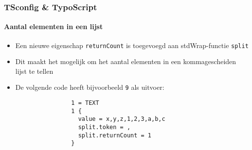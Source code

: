 \begin{frame}[fragile]
	\frametitle{TSconfig \& TypoScript}
	\framesubtitle{Aantal elementen in een lijst}

	\lstset{basicstyle=\tiny\ttfamily}

	\begin{itemize}

		\item Een nieuwe eigenschap \texttt{returnCount} is toegevoegd aan stdWrap-functie \texttt{split}

		\item Dit maakt het mogelijk om het aantal elementen in een kommagescheiden lijst te tellen

		\item De volgende code heeft bijvoorbeeld \texttt{9} als uitvoer:

			\begin{lstlisting}
				1 = TEXT
				1 {
				  value = x,y,z,1,2,3,a,b,c
				  split.token = ,
				  split.returnCount = 1
				}
			\end{lstlisting}

	\end{itemize}

\end{frame}

